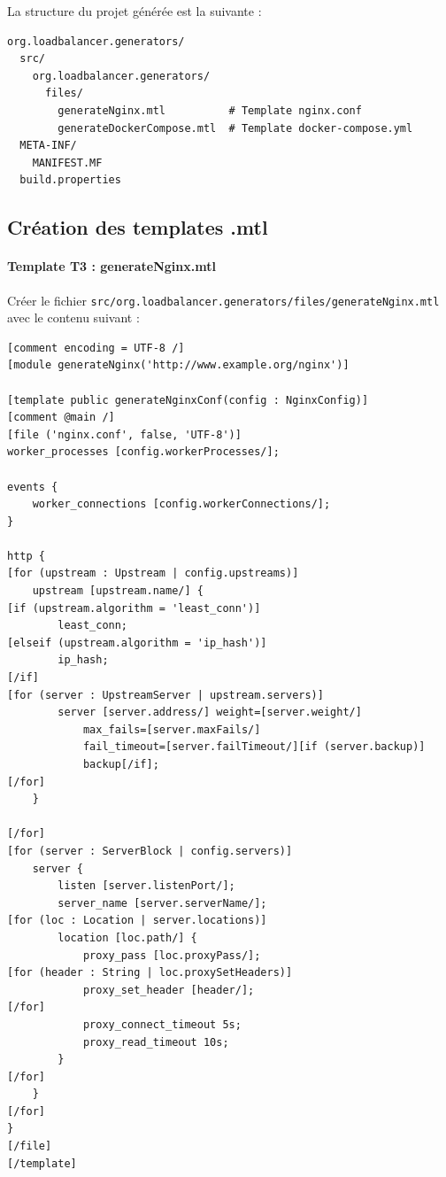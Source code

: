 \documentclass[12pt,a4paper]{report}
\begin{document}
La structure du projet générée est la suivante :

\begin{lstlisting}
org.loadbalancer.generators/
  src/
    org.loadbalancer.generators/
      files/
        generateNginx.mtl          # Template nginx.conf
        generateDockerCompose.mtl  # Template docker-compose.yml
  META-INF/
    MANIFEST.MF
  build.properties
\end{lstlisting}

\subsection{Création des templates .mtl}

\paragraph{Template T3 : generateNginx.mtl}

Créer le fichier \texttt{src/org.loadbalancer.generators/files/generateNginx.mtl} avec le contenu suivant :

\begin{lstlisting}[caption={Template Acceleo generateNginx.mtl}]
[comment encoding = UTF-8 /]
[module generateNginx('http://www.example.org/nginx')]

[template public generateNginxConf(config : NginxConfig)]
[comment @main /]
[file ('nginx.conf', false, 'UTF-8')]
worker_processes [config.workerProcesses/];

events {
    worker_connections [config.workerConnections/];
}

http {
[for (upstream : Upstream | config.upstreams)]
    upstream [upstream.name/] {
[if (upstream.algorithm = 'least_conn')]
        least_conn;
[elseif (upstream.algorithm = 'ip_hash')]
        ip_hash;
[/if]
[for (server : UpstreamServer | upstream.servers)]
        server [server.address/] weight=[server.weight/]
            max_fails=[server.maxFails/]
            fail_timeout=[server.failTimeout/][if (server.backup)]
            backup[/if];
[/for]
    }

[/for]
[for (server : ServerBlock | config.servers)]
    server {
        listen [server.listenPort/];
        server_name [server.serverName/];
[for (loc : Location | server.locations)]
        location [loc.path/] {
            proxy_pass [loc.proxyPass/];
[for (header : String | loc.proxySetHeaders)]
            proxy_set_header [header/];
[/for]
            proxy_connect_timeout 5s;
            proxy_read_timeout 10s;
        }
[/for]
    }
[/for]
}
[/file]
[/template]
\end{lstlisting}
\end{document}

